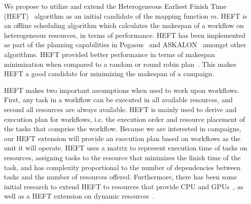 We propose to utilize and extend the Heterogeneous Earliest Finish Time (HEFT)~\cite{topcuoglu2002performance} algorithm  as an initial candidate of the mapping function $ m $.
HEFT is an offline scheduling algorithm which calculates the makespan of a workflow on heterogeneous resources, in terms of performance.
HEFT has been implemented as part of the planning capabilities in Pegasus~\cite{deelman2015pegasus} and ASKALON~\cite{fahringer2005askalon} amongst other algorithms.
HEFT provided better performance in terms of makespan minimization when compared to a random or round robin plan~\cite{deelman2015pegasus}.
This makes HEFT a good candidate for minimizing the makespan of a campaign.


HEFT makes two important assumptions when used to work upon workflows.
First, any task in a workflow can be executed in all available resources, and second all resources are always available.
HEFT is mainly used to derive and execution plan for workflows, i.e. the execution order and resource placement of the tasks that comprise the workflow.
Because we are interested in campaigns, our HEFT extension will provide an execution plan based on workflows as the unit it will operate.
HEFT uses a matrix to represent execution time of tasks on resources, assigning tasks to the resource that minimizes the finish time of the task, and has complexity proportional to the number of dependencies between tasks and the number of resources offered.
Furthermore, there has been some initial research to extend HEFT to resources that provide CPU and GPUs~\cite{shetti2013optimization}, as well as a HEFT extension on dynamic resources~\cite{dong2007pfas}.


